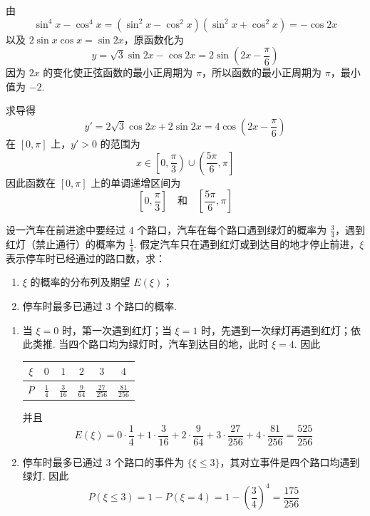 \begin{solution}
由
\[
\sin^4x-\cos^4x=\left(\sin^2x-\cos^2x\right)\left(\sin^2x+\cos^2x\right)=-\cos2x
\]
以及 \(2\sin x\cos x=\sin2x\)，原函数化为
\[
y=\sqrt{3}\sin2x-\cos2x=2\sin\left(2x-\frac{\pi}{6}\right)\]
因为 \(2x\) 的变化使正弦函数的最小正周期为 \(\pi\)，所以函数的最小正周期为 \(\pi\)，最小值为 \(-2\).

求导得
\[
y'=2\sqrt{3}\cos2x+2\sin2x=4\cos\left(2x-\frac{\pi}{6}\right)\]
在 \([0,\pi]\) 上，\(y'>0\) 的范围为
\[
x\in\left[0,\frac{\pi}{3}\right)\cup\left(\frac{5\pi}{6},\pi\right]\]
因此函数在 \([0,\pi]\) 上的单调递增区间为
\[
\left[0,\frac{\pi}{3}\right]\quad\text{和}\quad\left[\frac{5\pi}{6},\pi\right]\]
\end{solution}

\begin{problem}
设一汽车在前进途中要经过 \(4\) 个路口，汽车在每个路口遇到绿灯的概率为 \(\frac{3}{4}\)，遇到红灯（禁止通行）的概率为 \(\frac{1}{4}\). 假定汽车只在遇到红灯或到达目的地才停止前进，\(\xi\) 表示停车时已经通过的路口数，求：

\begin{enumerate}
\item \(\xi\) 的概率的分布列及期望 \(E(\xi)\)；
\item 停车时最多已通过 \(3\) 个路口的概率.
\end{enumerate}
\end{problem}

\begin{solution}
\begin{enumerate}
\item 当 \(\xi=0\) 时，第一次遇到红灯；当 \(\xi=1\) 时，先遇到一次绿灯再遇到红灯；依此类推. 当四个路口均为绿灯时，汽车到达目的地，此时 \(\xi=4\). 因此
\begin{center}
\begin{tabular}{c|ccccc}
\hline
\(\xi\)&\(0\)&\(1\)&\(2\)&\(3\)&\(4\)\\ \hline
\(P\)&\(\frac14\)&\(\frac{3}{16}\)&\(\frac{9}{64}\)&\(\frac{27}{256}\)&\(\frac{81}{256}\)\\ \hline
\end{tabular}
\end{center}
并且
\[
E(\xi)=0\cdot\frac14+1\cdot\frac{3}{16}+2\cdot\frac{9}{64}+3\cdot\frac{27}{256}+4\cdot\frac{81}{256}=\frac{525}{256}
\]

\item 停车时最多已通过 \(3\) 个路口的事件为 \(\{\xi\leqslant3\}\)，其对立事件是四个路口均遇到绿灯. 因此
\[
P(\xi\leqslant3)=1-P(\xi=4)=1-\left(\frac34\right)^4=\frac{175}{256}\]
\end{enumerate}
\end{solution}

